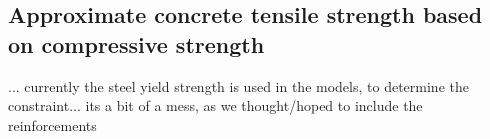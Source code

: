\subsection{Approximate concrete tensile strength based on compressive strength}
... currently the steel yield strength is used in the models, to determine the constraint...
its a bit of a mess, as we thought/hoped to include the reinforcements

